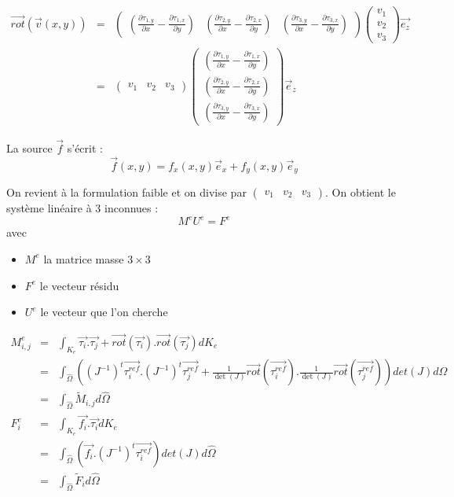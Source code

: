 \documentclass[a4paper,12pt]{article}
\begin{document}
\begin{eqnarray*}
\vec{rot}(\vec{v}(x,y)) &=&
\begin{pmatrix} 
(\frac{\partial \tau_{1,y}}{\partial x} - \frac{\partial \tau_{1,x}}{\partial y})
&
(\frac{\partial \tau_{2,y}}{\partial x} - \frac{\partial \tau_{2,x}}{\partial y})
&
(\frac{\partial \tau_{3,y}}{\partial x} - \frac{\partial \tau_{3,x}}{\partial y})
\end{pmatrix}
\begin{pmatrix}
  v_{1} \\ v_{2} \\ v_{3}
\end{pmatrix}
\vec{e_{z}} \\
&=& 
\begin{pmatrix}
  v_{1} & v_{2} & v_{3}
\end{pmatrix}
\begin{pmatrix}
(\frac{\partial \tau_{1,y}}{\partial x} - \frac{\partial \tau_{1,x}}{\partial y}) 
\\
(\frac{\partial \tau_{2,y}}{\partial x} - \frac{\partial \tau_{2,x}}{\partial y})
\\
(\frac{\partial \tau_{3,y}}{\partial x} - \frac{\partial \tau_{3,x}}{\partial y})
\end{pmatrix}
\vec{e}_{z}
\end{eqnarray*}

La source $\vec{f}$ s'écrit :
\[
\vec{f}(x,y) =
f_{x}(x,y) \vec{e}_{x} + f_{y}(x,y) \vec{e}_{y}
\]

On revient à la formulation faible et on divise par $\begin{pmatrix} v_{1} & v_{2} & v_{3} \end{pmatrix}$. On obtient le système linéaire à 3 inconnues :
\[M^{e}U^{e} = F^{e}\]
avec
\begin{itemize}
\item $M^{e}$ la matrice masse $3\times3$
\item $F^{e}$ le vecteur résidu
\item $U^{e}$ le vecteur que l'on cherche
\end{itemize}

\begin{eqnarray*}
M^{e}_{i,j} &=& \int_{K_{e}} {\vec{\tau_{i}}.\vec{\tau_{j}} + \vec{rot}(\vec{\tau_{i}}).\vec{rot}(\vec{\tau_{j}}) dK_{e}} \\
&=&
\int_{\hat{\Omega}} {((J^{-1})^{t}\vec{\tau_{i}^{ref}}.(J^{-1})^{t}\vec{\tau_{j}^{ref}} + \frac{1}{\det(J)}\vec{rot}(\vec{\tau_{i}^{ref}}).\frac{1}{\det(J)}\vec{rot}(\vec{\tau_{j}^{ref}}))det(J) d\hat{\Omega}} \\
&=&
\int_{\hat{\Omega}} {\tilde{M}_{i,j} d\hat{\Omega}} \\
F^{e}_{i} &=&
\int_{K_{e}} {\vec{f_{i}}.\vec{\tau_{i}} dK_{e}} \\
&=&
\int_{\hat{\Omega}} {(\vec{f_{i}}.(J^{-1})^{t}\vec{\tau_{i}^{ref}}) det(J) d\hat{\Omega}} \\
&=&
\int_{\hat{\Omega}} {\tilde{F}_{i} d\hat{\Omega}} \\
\end{eqnarray*}
\end{document}
